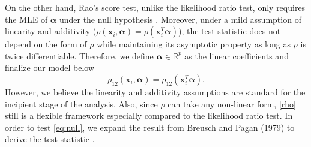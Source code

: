 \documentclass[aoas,preprint]{imsart}
\numberwithin{equation}{section}
\theoremstyle{plain}
\begin{document}
On the other hand, Rao's score test, unlike the likelihood ratio test, only requires the MLE of $\bm{\alpha}$ under the null hypothesis \cite{rao1973linear}. Moreover, under a mild assumption of linearity and additivity ($\rho(\bm{x}_i, \bm{\alpha}) = \rho(\bm{x}_i^T\bm{\alpha})$), the test statistic does not depend on the form of $\rho$ while maintaining its asymptotic property as long as $\rho$ is twice differentiable. Therefore, we define $\bm{\alpha} \in \mathbb{R}^{p}$ as the linear coefficients and finalize our model below
\begin{equation}
    \rho_{12}(\bm{x}_i, \bm{\alpha}) = \rho_{12}(\bm{x}_i^T\bm{\alpha}). \label{rho}
\end{equation}
However, we believe the linearity and additivity assumptions are standard for the incipient stage of the analysis. Also, since $\rho$ can take any non-linear form, \ref{rho} still is a flexible framework  especially compared to the likelihood ratio test. In order to test \ref{eq:null}, we expand the result from Breusch and Pagan (1979) to derive the test statistic \cite{breusch1979simple}.\\ %
\end{document}
